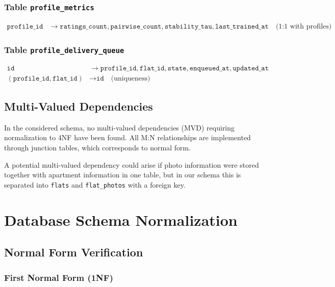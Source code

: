 \documentclass[12pt,a4paper]{article}
\begin{document}
\subsubsection{Table \texttt{profile\_metrics}}
\begin{align}
    \texttt{profile\_id} &\rightarrow \texttt{ratings\_count}, \texttt{pairwise\_count}, \texttt{stability\_tau}, \texttt{last\_trained\_at} \quad \text{(1:1 with profiles)}
\end{align}

\subsubsection{Table \texttt{profile\_delivery\_queue}}
\begin{align}
    \texttt{id} &\rightarrow \texttt{profile\_id}, \texttt{flat\_id}, \texttt{state}, \texttt{enqueued\_at}, \texttt{updated\_at} \\
    (\texttt{profile\_id}, \texttt{flat\_id}) &\rightarrow \texttt{id} \quad \text{(uniqueness)}
\end{align}

\subsection{Multi-Valued Dependencies}

In the considered schema, no multi-valued dependencies (MVD) requiring normalization to 4NF have been found. All M:N relationships are implemented through junction tables, which corresponds to normal form.

A potential multi-valued dependency could arise if photo information were stored together with apartment information in one table, but in our schema this is separated into \texttt{flats} and \texttt{flat\_photos} with a foreign key.

\section{Database Schema Normalization}

\subsection{Normal Form Verification}

\subsubsection{First Normal Form (1NF)}
\end{document}
